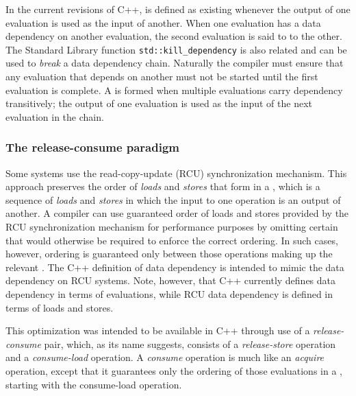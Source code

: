 In the current revisions of C++,  is defined as
existing whenever the output of one evaluation is used as the input of
another. 
 When one evaluation has a data dependency on another
evaluation, the second evaluation is said to 
to the other. The Standard Library function
\lstinline!std::kill_dependency! is also related and can be used to
  \emph{break} a data dependency chain. Naturally the compiler must
ensure that any evaluation that depends on another must not be started
until the first evaluation is complete. A 
is formed when multiple evaluations carry dependency transitively; the
output of one evaluation is used as the input of the next evaluation in
the chain.

\subsubsection[The release-consume paradigm]{The release-consume paradigm}\label{the-release-consume-paradigm}

Some systems use the read-copy-update (RCU) synchronization mechanism.
This approach preserves the order of \emph{loads} and \emph{stores} that
form in a , which is a sequence of
\emph{loads} and \emph{stores} in which the input to one operation is an
output of another. A compiler can use guaranteed order of loads
and stores provided by the RCU synchronization mechanism for performance purposes by omitting certain
 that would otherwise be required to
enforce the correct ordering. In such cases, however, ordering is
guaranteed only between those operations making up the relevant
. The C++ definition
of data dependency is intended to mimic the data dependency on RCU
systems. Note, however, that C++ currently defines data dependency in
terms of evaluations, while RCU data dependency is defined in terms of
  loads and stores.

This optimization was intended to be available in C++ through use of a
\emph{release-consume} pair, which, as its name
suggests, consists of a \emph{release-store} operation and a
\emph{consume-load} operation. A \emph{consume} operation is much like
an \emph{acquire} operation, except that it guarantees only the ordering
of those evaluations in a , starting with
the consume-load operation.


